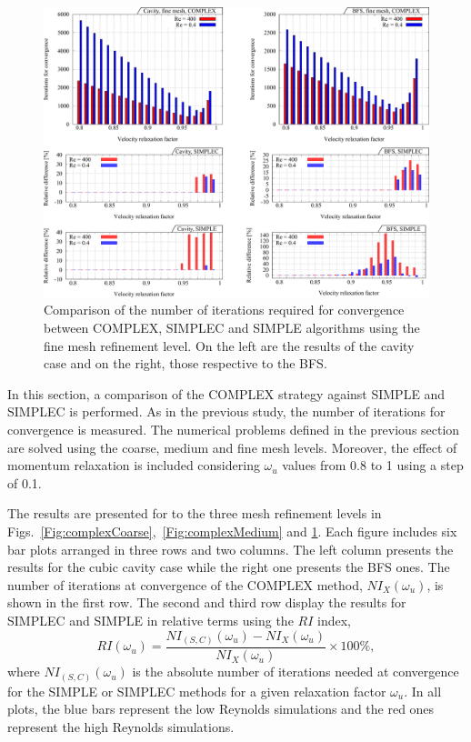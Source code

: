 \documentclass[final,3p,times,11pt,onecolumn]{myElsarticle}
\numberwithin{equation}{section}
\begin{document}
\begin{figure}[t!]
\centering
\includegraphics[width=17cm]{fig/Results/complexFine.pdf}
\caption{Comparison of the number of iterations required for convergence between COMPLEX, SIMPLEC and SIMPLE algorithms using the fine mesh refinement level. On the left are the results of the cavity case and on the right, those respective to the BFS.}
\label{Fig:complexFine}
\end{figure}
In this section, a comparison of the COMPLEX strategy against SIMPLE and SIMPLEC is performed.
As in the previous study, the number of iterations for convergence is measured. The numerical problems defined in the previous section are solved using the coarse, medium and fine mesh levels. Moreover, the effect of momentum relaxation is included considering $\omega_u$ values from 0.8 to 1 using a step of 0.1.


The results are presented for to the three mesh refinement levels in Figs.~\ref{Fig:complexCoarse},~\ref{Fig:complexMedium} and \ref{Fig:complexFine}. Each figure includes six bar plots arranged in three rows and two columns. The left column presents the results for the cubic cavity case while the right one presents the BFS ones. The number of iterations at convergence of the COMPLEX method, $NI_X(\omega_u)$, is shown in the first row. The second and third row display the results for SIMPLEC and SIMPLE in relative terms using the $RI$ index,
\begin{equation}
RI(\omega_u)
=
\dfrac
{NI_{(S,C)}(\omega_u) - NI_X(\omega_u)}
{NI_X(\omega_u)}
\times
100\%,
\end{equation}
where $NI_{(S,C)}(\omega_u)$ is the absolute number of iterations needed at convergence for the SIMPLE or SIMPLEC methods for a given relaxation factor $\omega_u$. 
In all plots, the blue bars represent the low Reynolds simulations and the red ones represent the high Reynolds simulations.
\end{document}
